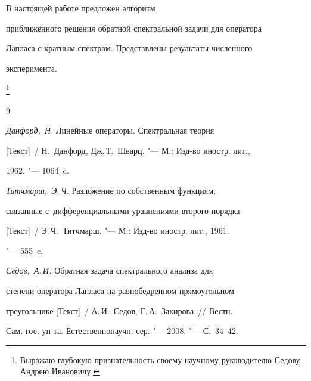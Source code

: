  В настоящей работе предложен алгоритм

приближённого решения обратной спектральной задачи для оператора

Лапласа с кратным спектром. Представлены результаты численного

эксперимента.





\thanks{Выражаю глубокую признательность своему научному руководителю Седову Андрею Ивановичу.}






\begin{thebibliography}{9}




\emph{Данфорд,~Н.} Линейные операторы. Спектральная теория

[Текст]~/ Н.~Данфорд, \linebreak Дж.\,Т.~Шварц. "--- М.: Изд-во иностр. лит., 

1962. "--- 1064~c.






\emph{Титчмарш,~Э.\,Ч.} Разложение по собственным функциям, 

связанные с~дифференциальными уравнениями второго порядка

[Текст]~/ Э.\,Ч.~Титчмарш. "--- М.: Изд-во иностр. лит.,  1961.

"--- 555~c.






\emph{Седов,~А.\,И.} Обратная задача спектрального анализа для

степени оператора Лапласа на равнобедренном прямоугольном

треугольнике [Текст]~/ А.\,И.~Седов,  Г.\,А.~Закирова~/\!/ Вестн.

Сам. гос. ун-та. Естественнонаучн. сер. "--- 2008. "--- С.~34--42.



\end{thebibliography}





\newpage



\makeengtitle



\newpage



\tableofengcontents





